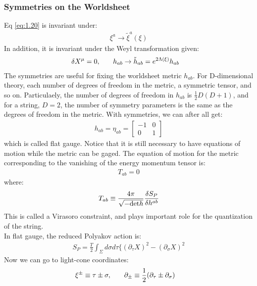 \subsubsection{Symmetries on the Worldsheet}
Eq \ref{eq:1.20} is invariant under:
\begin{align}
    \xi ^{a} \rightarrow \tilde{\xi} ^{a} (\xi)
\end{align}
In addition, it is invariant under the Weyl transformation given:
\begin{align}
    \delta X^{\mu} = 0, & \qq{} h_{ab} \rightarrow \tilde{h}_{ab} = e^{2\Lambda (\xi)} h_{ab}
\end{align}
The symmetries are useful for fixing the worldsheet metric $h_{ab}$. For D-dimensional theory, each number of degrees of freedom in the metric, a symmetric tensor, and so on. Particulaely, the number of degrees of freedom in $h_{ab}$ is $\frac{1}{2}D(D+1)$, and for a string, $D=2$, the number of symmetry parameters is the same as the degrees of freedom in the metric. With symmetries, we can after all get:
\begin{align}
    h_{ab} = \eta _{ab} = 
    \begin{bmatrix}
        -1 & 0 \\
        0 & 1
    \end{bmatrix}
\end{align}
which is called flat gauge. Notice that it is still necessary to have equations of motion while the metric can be gaged. The equation of motion for the metric corresponding to the vanishing of the energy momentum tensor is:
\begin{align}
    T_{ab} =0
\end{align}
where:
\begin{align}
    T_{ab} \equiv \frac{4\pi}{\sqrt{-\text{det} h}} \fdv{S_{P}}{h^{ab}}
\end{align}
This is called a Virasoro constraint, and plays important role for the quantization of the string. \\
\indent In flat gauge, the reduced Polyakov action is:
\begin{align}
    S_{P} = \frac{T}{2} \int _{\Sigma} d\sigma d\tau \lbrace (\partial _{\tau} X)^{2} - (\partial _{\sigma} X)^{2}  
\end{align}
Now we can go to light-cone coordinates:
\begin{align}
    \xi ^{\pm} \equiv \tau \pm \sigma, & \qq{} \partial _{\pm} \equiv \frac{1}{2} (\partial _{\tau} \pm \partial _{\sigma})
\end{align}
